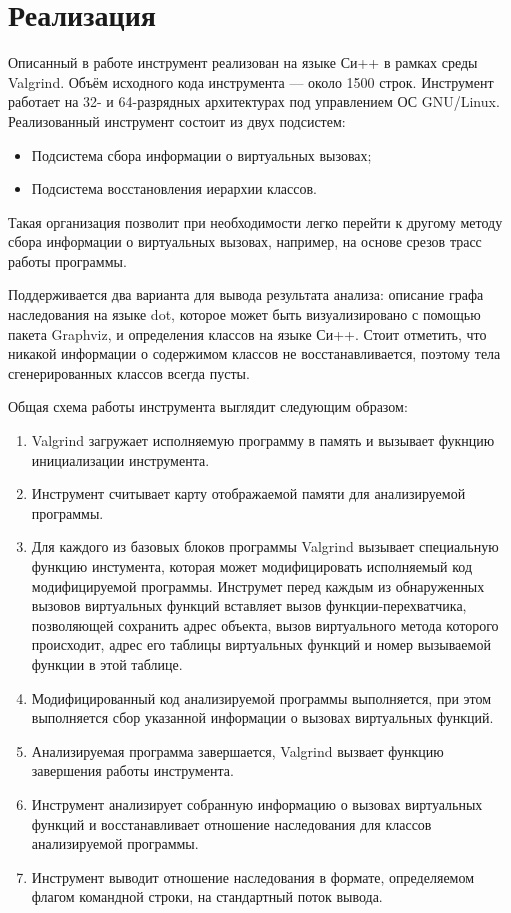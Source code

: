 \documentclass[a4paper,12pt,russian]{article}
\newcommand{\code}[1]{\textsf{#1}}
\begin{document}
\newpage
\section{Реализация}
Описанный в работе инструмент реализован на языке Си++ в рамках среды \code{Valgrind}. Объём исходного кода инструмента --- около 1500 строк.
Инструмент работает на 32- и 64-разрядных архитектурах под управлением ОС \code{GNU/Linux}.
Реализованный инструмент состоит из двух подсистем:
\begin{itemize}
    \item Подсистема сбора информации о виртуальных вызовах;
    \item Подсистема восстановления иерархии классов.
\end{itemize}
Такая организация позволит при необходимости легко перейти к другому методу сбора информации о виртуальных вызовах, например, на основе срезов трасс работы программы.

Поддерживается два варианта для вывода результата анализа: описание графа наследования на языке \code{dot}, которое может быть визуализировано с помощью пакета \code{Graphviz}, и определения классов на языке Си++.
Стоит отметить, что никакой информации о содержимом классов не восстанавливается, поэтому тела сгенерированных классов всегда пусты.

Общая схема работы инструмента выглядит следующим образом:
\begin{enumerate}
    \item \code{Valgrind} загружает исполняемую программу в память и вызывает фукнцию инициализации инструмента.
    \item Инструмент считывает карту отображаемой памяти для анализируемой программы.
    \item Для каждого из базовых блоков программы \code{Valgrind} вызывает специальную функцию инстумента, которая может модифицировать исполняемый код модифицируемой программы. Инструмет перед каждым из обнаруженных вызовов виртуальных функций вставляет вызов функции-перехватчика, позволяющей сохранить адрес объекта, вызов виртуального метода которого происходит, адрес его таблицы виртуальных функций и номер вызываемой функции в этой таблице.
    \item Модифицированный код анализируемой программы выполняется, при этом выполняется сбор указанной информации о вызовах виртуальных функций.
    \item Анализируемая программа завершается, \code{Valgrind} вызвает функцию завершения работы инструмента.
    \item Инструмент анализирует собранную информацию о вызовах виртуальных функций и восстанавливает отношение наследования для классов анализируемой программы.
    \item Инструмент выводит отношение наследования в формате, определяемом флагом командной строки, на стандартный поток вывода.
\end{enumerate}
\end{document}
